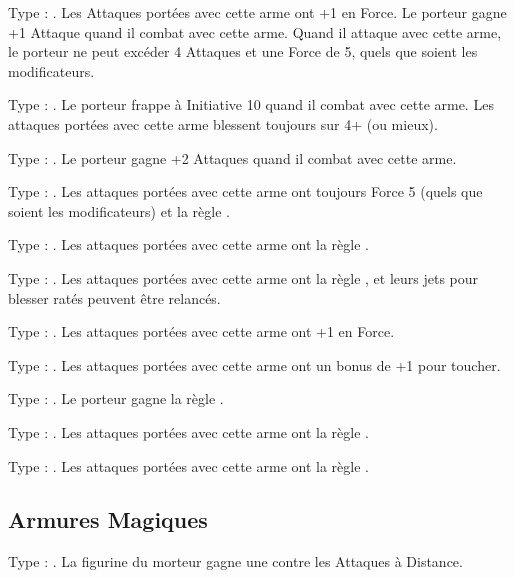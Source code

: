 Type : \hw{}. Les Attaques portées avec cette arme ont +1 en Force. Le porteur gagne +1 Attaque quand il combat avec cette arme. Quand il attaque avec cette arme, le porteur ne peut excéder 4 Attaques et une Force de 5, quels que soient les modificateurs.

Type : \hw{}. Le porteur frappe à Initiative 10 quand il combat avec cette arme. Les attaques portées avec cette arme blessent toujours sur 4+ (ou mieux).

\columnbreak

Type : \hw{}. Le porteur gagne +2 Attaques quand il combat avec cette arme.

Type : \halberd{}. Les attaques portées avec cette arme ont toujours Force 5 (quels que soient les modificateurs) et la règle .

Type : \gw{}. Les attaques portées avec cette arme ont la règle .

Type : \hw{}. Les attaques portées avec cette arme ont la règle \divineattacks{}, et leurs jets pour blesser ratés peuvent être relancés.

Type : \hw{}. Les attaques portées avec cette arme ont +1 en Force.

Type : \hw{}. Les attaques portées avec cette arme ont un bonus de +1 pour toucher.

Type : \pw{}. Le porteur gagne la règle \fear{}.

Type : \lance{}. Les attaques portées avec cette arme ont la règle \flamingattacks{}.

Type : \hw{}. Les attaques portées avec cette arme ont la règle .

\endpricelist

\newpage
\subsection{Armures Magiques}

\startpricelist

Type : \shield{}. La figurine du morteur gagne une  contre les Attaques à Distance.

